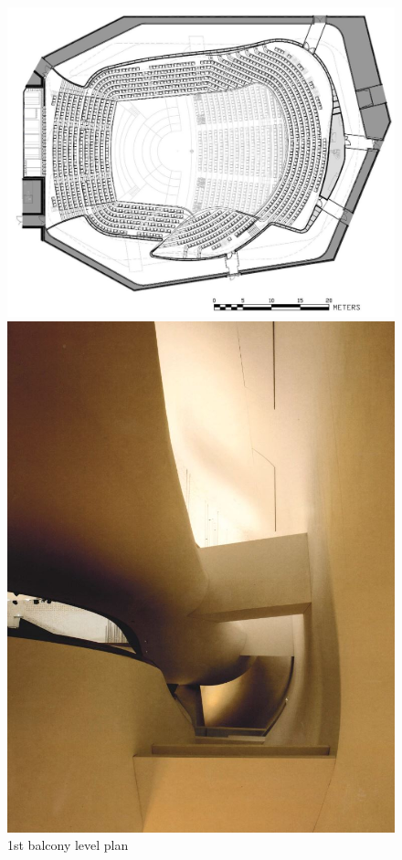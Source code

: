 \begin{figure}[htbp]
 \begin{minipage}{0.5\hsize}
  \begin{center}
   \includegraphics[scale=0.15]{01_att/PLAN_1st_Balcony_Level.jpg}
  \end{center}
  \caption{\hspace{1mm}1st balcony level plan}
 \end{minipage}
 \begin{minipage}{0.5\hsize}
  \begin{center}
   \includegraphics[scale=0.19]{01_att/suspended.JPG}

\end{center}
\end{minipage}
\end{figure}
